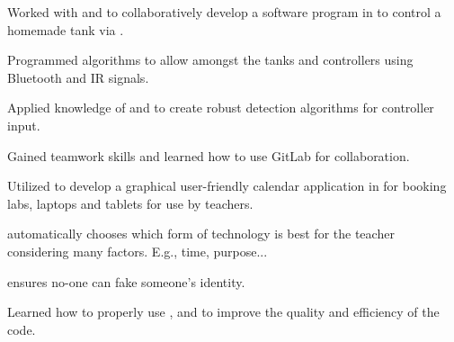 \documentclass[dvipsnames]{deedy-resume-openfont}
\begin{document}
\begin{minipage}[t]{0.67\textwidth}

  \hfill\break
  \begin{tightemize}
  	\item Worked with  and  to collaboratively develop a software program in  to control a homemade tank via .
    \item Programmed algorithms to allow  amongst the tanks and controllers using Bluetooth and IR signals.
    \item Applied knowledge of  and  to create robust  detection algorithms for controller input.
    \item Gained teamwork skills and learned how to use GitLab for collaboration.
  \end{tightemize}
  \sectionsep

  \begin{tightemize}
  	\item Utilized  to develop a graphical user-friendly calendar application in  for booking labs, laptops and tablets for use by teachers.
    \item {} automatically chooses which form of technology is best for the teacher considering many factors. E.g., time, purpose...
    \item {} ensures no-one can fake someone's identity.
    \item Learned how to properly use ,  and  to improve the quality and efficiency of the code.
  \end{tightemize}
  \sectionsep
  


\end{minipage}
\end{document}
